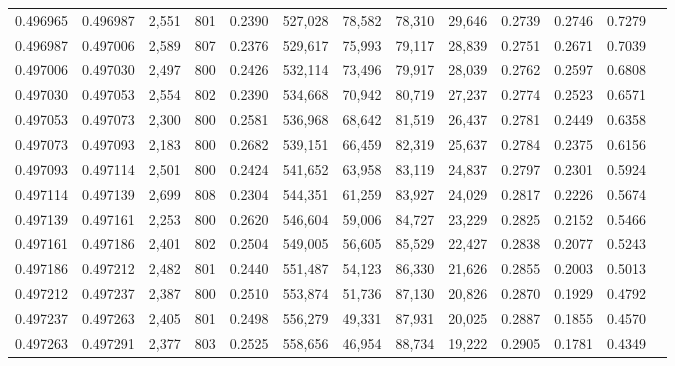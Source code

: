 \begin{tabular}{rrrrrrrrrrrrr}
0.496965 & 0.496987 &  2,551 & 801 &                                     0.2390 & 527,028 &  78,582 &  78,310 &  29,646 & 0.2739 & 0.2746 & 0.7279 \\
0.496987 & 0.497006 &  2,589 & 807 &                                     0.2376 & 529,617 &  75,993 &  79,117 &  28,839 & 0.2751 & 0.2671 & 0.7039 \\
0.497006 & 0.497030 &  2,497 & 800 &                                     0.2426 & 532,114 &  73,496 &  79,917 &  28,039 & 0.2762 & 0.2597 & 0.6808 \\
0.497030 & 0.497053 &  2,554 & 802 &                                     0.2390 & 534,668 &  70,942 &  80,719 &  27,237 & 0.2774 & 0.2523 & 0.6571 \\
0.497053 & 0.497073 &  2,300 & 800 &                                     0.2581 & 536,968 &  68,642 &  81,519 &  26,437 & 0.2781 & 0.2449 & 0.6358 \\
0.497073 & 0.497093 &  2,183 & 800 &                                     0.2682 & 539,151 &  66,459 &  82,319 &  25,637 & 0.2784 & 0.2375 & 0.6156 \\
0.497093 & 0.497114 &  2,501 & 800 &                                     0.2424 & 541,652 &  63,958 &  83,119 &  24,837 & 0.2797 & 0.2301 & 0.5924 \\
0.497114 & 0.497139 &  2,699 & 808 &                                     0.2304 & 544,351 &  61,259 &  83,927 &  24,029 & 0.2817 & 0.2226 & 0.5674 \\
0.497139 & 0.497161 &  2,253 & 800 &                                     0.2620 & 546,604 &  59,006 &  84,727 &  23,229 & 0.2825 & 0.2152 & 0.5466 \\
0.497161 & 0.497186 &  2,401 & 802 &                                     0.2504 & 549,005 &  56,605 &  85,529 &  22,427 & 0.2838 & 0.2077 & 0.5243 \\
0.497186 & 0.497212 &  2,482 & 801 &                                     0.2440 & 551,487 &  54,123 &  86,330 &  21,626 & 0.2855 & 0.2003 & 0.5013 \\
0.497212 & 0.497237 &  2,387 & 800 &                                     0.2510 & 553,874 &  51,736 &  87,130 &  20,826 & 0.2870 & 0.1929 & 0.4792 \\
0.497237 & 0.497263 &  2,405 & 801 &                                     0.2498 & 556,279 &  49,331 &  87,931 &  20,025 & 0.2887 & 0.1855 & 0.4570 \\
0.497263 & 0.497291 &  2,377 & 803 &                                     0.2525 & 558,656 &  46,954 &  88,734 &  19,222 & 0.2905 & 0.1781 & 0.4349 \\

\end{tabular}
